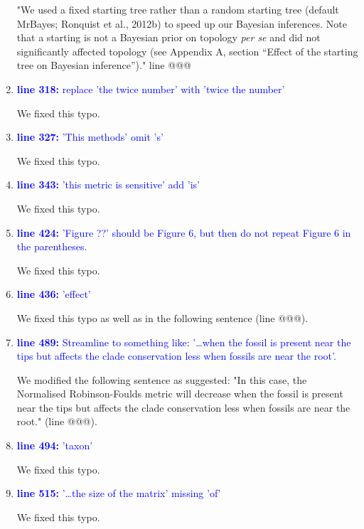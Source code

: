 \documentclass[12pt,letterpaper]{article}
\begin{document}
\begin{enumerate}
"We used a fixed starting tree rather than a random starting tree (default MrBayes; Ronquist et al., 2012b) to speed up our Bayesian inferences.
Note that a starting is not a Bayesian prior on topology \textit{per se} and did not significantly affected topology (see Appendix A, section ``Effect of the starting tree on Bayesian inference'')." line @@@ 


\item{\textcolor{blue}{\textbf{line 318:} replace 'the twice number' with 'twice the number'}}

We fixed this typo.

\item{\textcolor{blue}{\textbf{line 327:} 'This methods' omit 's'}}

We fixed this typo.

\item{\textcolor{blue}{\textbf{line 343:} 'this metric is sensitive' add 'is'}}

We fixed this typo.

\item{\textcolor{blue}{\textbf{line 424:} 'Figure ??' should be Figure 6, but then do not repeat Figure 6 in the parentheses. }}

We fixed this typo.

\item{\textcolor{blue}{\textbf{line 436:} 'effect'}}

We fixed this typo as well as in the following sentence (line @@@).

\item{\textcolor{blue}{\textbf{line 489:} Streamline to something like: '…when the fossil is present near the tips but affects the clade conservation less when fossils are near the root'. }}

We modified the following sentence as suggested: "In this case, the Normalised Robinson-Foulds metric will decrease when the fossil is present near the tips but affects the clade conservation less when fossils are near the root." (line @@@).

\item{\textcolor{blue}{\textbf{line 494:} 'taxon'}}

We fixed this typo.

\item{\textcolor{blue}{\textbf{line 515:} '…the size of the matrix' missing 'of'}}

We fixed this typo.


\end{enumerate}
\end{document}
